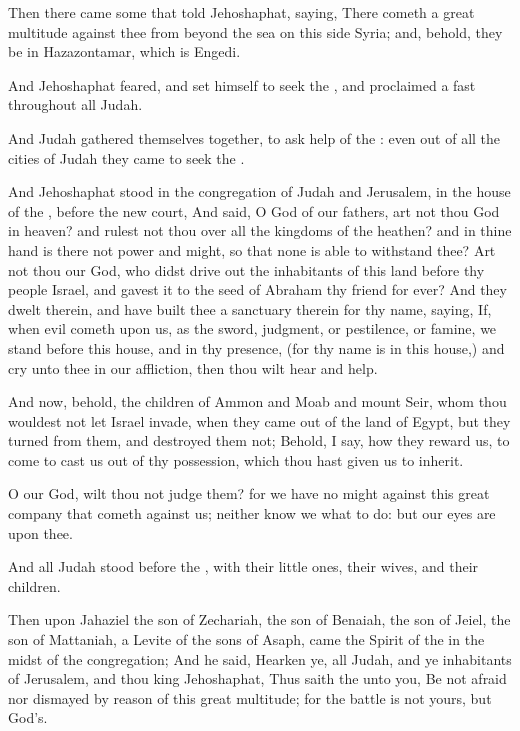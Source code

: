 \Verse Then there came some that told Jehoshaphat, saying, There cometh a great multitude against thee from beyond the sea on this side Syria; and, behold, they be in Hazazontamar, which is Engedi.

\Verse And Jehoshaphat feared, and set himself to seek the \LORD, and proclaimed a fast throughout all Judah.

\Verse And Judah gathered themselves together, to ask help of the \LORD: even out of all the cities of Judah they came to seek the \LORD.

\Verse And Jehoshaphat stood in the congregation of Judah and Jerusalem, in the house of the \LORD, before the new court, \Verse And said, O \LORD God of our fathers, art not thou God in heaven? and rulest not thou over all the kingdoms of the heathen? and in thine hand is there not power and might, so that none is able to withstand thee?  \Verse Art not thou our God, who didst drive out the inhabitants of this land before thy people Israel, and gavest it to the seed of Abraham thy friend for ever?  \Verse And they dwelt therein, and have built thee a sanctuary therein for thy name, saying, \Verse If, when evil cometh upon us, as the sword, judgment, or pestilence, or famine, we stand before this house, and in thy presence, (for thy name is in this house,) and cry unto thee in our affliction, then thou wilt hear and help.

\Verse And now, behold, the children of Ammon and Moab and mount Seir, whom thou wouldest not let Israel invade, when they came out of the land of Egypt, but they turned from them, and destroyed them not; \Verse Behold, I say, how they reward us, to come to cast us out of thy possession, which thou hast given us to inherit.

\Verse O our God, wilt thou not judge them? for we have no might against this great company that cometh against us; neither know we what to do: but our eyes are upon thee.

\Verse And all Judah stood before the \LORD, with their little ones, their wives, and their children.

\Verse Then upon Jahaziel the son of Zechariah, the son of Benaiah, the son of Jeiel, the son of Mattaniah, a Levite of the sons of Asaph, came the Spirit of the \LORD in the midst of the congregation; \Verse And he said, Hearken ye, all Judah, and ye inhabitants of Jerusalem, and thou king Jehoshaphat, Thus saith the \LORD unto you, Be not afraid nor dismayed by reason of this great multitude; for the battle is not yours, but God's.

